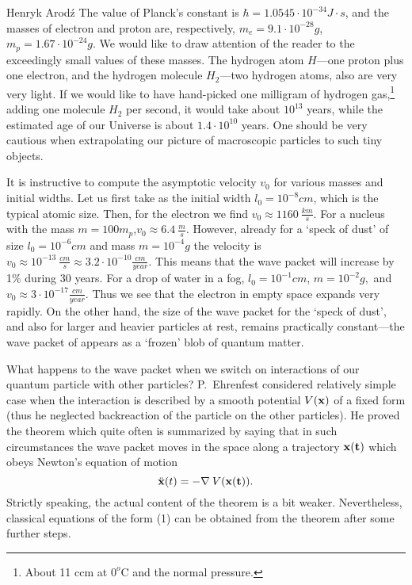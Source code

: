 \begin{artengenv}{Henryk Arod\'z}
 The value of Planck's constant is
$\hbar = 1.0545 \cdot 10^{-34} J \cdot s$, and the masses of electron and proton are, respectively, $m_e= 9.1 \cdot 10^{-28} g$,
$m_p = 1.67 \cdot 10^{-24} g $. We would like to draw attention of the reader to the exceedingly small values of these masses. The hydrogen atom $H$---one proton plus one electron, and the hydrogen molecule $H_2$---two hydrogen atoms, also are very very light. If we would like to have hand-picked one milligram of hydrogen gas,\footnote{About 11 ccm at $0^{o}$C and the normal pressure.} adding one molecule $H_2$ per second, it would take about $10^{13}$ years, while the estimated age of our Universe is about $1.4 \cdot 10^{10}$ years. One should be very cautious when extrapolating our picture of macroscopic particles to such tiny objects.

It is instructive to compute the asymptotic velocity $v_0$ for various masses and initial widths. 
Let us first take as the initial width $l_0 = 10^{-8} cm $, which is the typical atomic size. Then, for the electron we find 
 $v_0 \approx 1160 \: \frac{km}{s}.$ For a nucleus with the mass
\mbox{$m= 100 m_p$,}\linebreak[4]
\mbox{$v_0 \approx 6.4 \: \frac{m}{s}$.}
 However, already for a `speck of dust' of size
 \mbox{$l_0=10^{-6} cm$}
 and mass 
 $m=10^{-4} g$ the velocity is $v_0 \approx 10^{-13} \: \frac{cm}{s} \approx 3.2 \cdot 10^{-10} \frac{cm}{year}.$ This means that the wave packet will increase by 1\% during 30 years. For a drop of water in a fog, $l_0 = 10^{-1} cm$, $m=10^{-2}g,$ and $v_0\approx 3\cdot 10^{-17} \frac{cm}{year}$. Thus we see that the electron in empty space expands very rapidly. On the other hand, the size of the wave packet for the `speck of dust', and also for larger and heavier particles at rest, remains practically constant---the wave packet of appears as a `frozen' blob of quantum matter. 


What happens to the wave packet when we switch on interactions of our quantum particle with other particles? P.~Ehrenfest considered relatively simple case when the interaction is described by a smooth potential $V(\bf{x})$ of a fixed form (thus he neglected backreaction of the particle on the other particles). He proved the theorem which quite often is summarized by saying that in such circumstances the wave packet moves in the space along a trajectory $\bf{x}(t)$ which obeys Newton's equation of motion
\begin{equation} \ddot{\bf{x}}(t) = - \nabla \:V(\bf{x}(t)). \end{equation} 
Strictly speaking, the actual content of the theorem is a bit weaker. Nevertheless, classical equations of the form (1) can be obtained from the theorem after some further steps. 



\end{artengenv}
